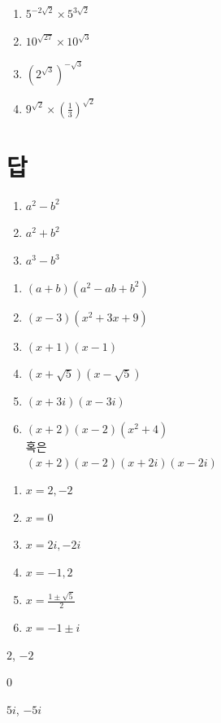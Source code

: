 \documentclass{oblivoir}
\begin{document}
%
\begin{enumerate}\label{real4}
\item
\(5^{-2\sqrt2}\times5^{3\sqrt2}\)
\item
\(10^{\sqrt{27}}\times10^{\sqrt3}\)
\item
\((2^{\sqrt3})^{-\sqrt3}\)
\item
\(\displaystyle9^{\sqrt2}\times\left(\frac13\right)^{\sqrt2}\)
\end{enumerate}

%
\section*{답}
\begin{multicols*}{2}
%
\begin{enumerate}
\item
\(a^2-b^2\)
\item
\(a^2+b^2\)
\item
\(a^3-b^3\)
\end{enumerate}

%
\begin{enumerate}
\item
\((a+b)(a^2-ab+b^2)\)
\item
\((x-3)(x^2+3x+9)\)
\item
\((x+1)(x-1)\)
\item
\((x+\sqrt5)(x-\sqrt5)\)
\item
\((x+3i)(x-3i)\)
\item
\((x+2)(x-2)(x^2+4)\)\\
혹은\\
\((x+2)(x-2)(x+2i)(x-2i)\)
\end{enumerate}

%
\begin{enumerate}
\item
\(x=2,-2\)
\item
\(x=0\)
\item
\(x=2i,-2i\)
\item
\(x=-1,2\)
\item
\(x=\frac{1\pm\sqrt5}2\)
\item
\(x=-1\pm i\)
\end{enumerate}

%
\begin{enumerate*}[itemjoin=\hspace{.05\textwidth}]
\item
\(2\), \(-2\)
\item
\(0\)
\item
\(5i\), \(-5i\)
\end{enumerate*}



\end{multicols*}
\end{document}
